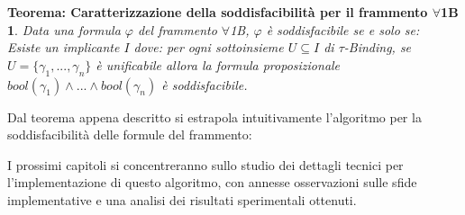\documentclass[./main.tex]{subfiles}
\begin{document}
\newtheorem{forall1bsat}[thm]{Teorema: Caratterizzazione della soddisfacibilità per il frammento $\forall$1B}
\begin{forall1bsat}
    Data una formula $\varphi$ del frammento $\forall$1B, $\varphi$ è soddisfacibile se e solo se: \\
    Esiste un implicante $I$ dove: per ogni sottoinsieme $U \subseteq I$ di $\tau$-Binding,
    se $U=\{\gamma_1, ..., \gamma_n\}$ è unificabile allora la formula proposizionale $bool(\gamma_1) \land ... \land bool(\gamma_n)$ è soddisfacibile.
\end{forall1bsat}

Dal teorema appena descritto si estrapola intuitivamente l'algoritmo per la soddisfacibilità delle formule del frammento:

\begin{algorithm}[H]
    \caption{Algoritmo per la soddisfacibilità del frammento $\forall$1B}
  

    \Return{$\bot$}
  \end{algorithm}

I prossimi capitoli si concentreranno sullo studio dei dettagli tecnici per l'implementazione di questo algoritmo,
con annesse osservazioni sulle sfide implementative e una analisi dei risultati sperimentali ottenuti.
\end{document}
